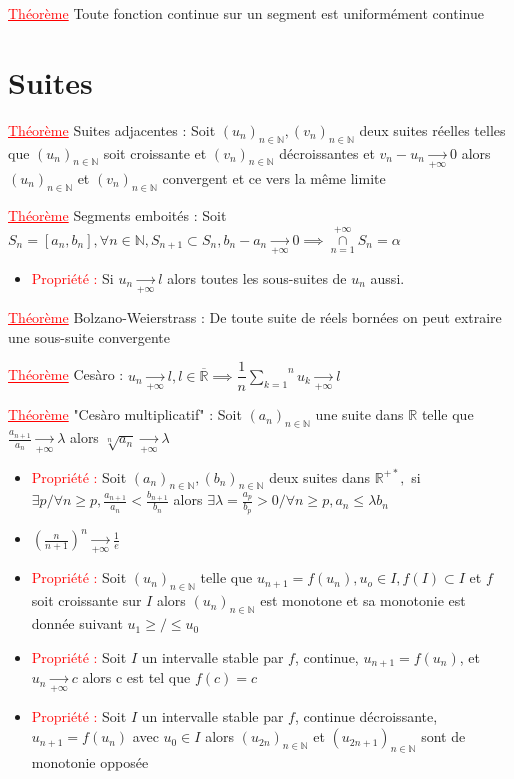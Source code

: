 \documentclass[a4paper, french]{article}
\newcommand{\R}{\mathbb{R}}
\newcommand{\N}{\mathbb{N}}
\newcommand{\al}{\alpha}
\newcommand{\la}{\lambda}
\newcommand{\som}[2]{\overset{#2}{\underset{#1}{\sum}}}
\newcommand{\thm}{\textcolor{red}{\underline{Théorème} }}
\newcommand{\ppt}{\textcolor{red}{Propriété : }}
\newcommand{\limit}[1]{\underset{#1}{\rightarrow}}
\newcommand{\inv}[1]{\frac{1}{#1}}
\begin{document}
	 \thm Toute fonction continue sur un segment est uniformément continue

	\section{Suites}
	 \thm Suites adjacentes : Soit $(u_n)_{n \in \N}, (v_n)_{n \in \N}$ deux suites réelles telles que $(u_n)_{n \in \N}$ soit croissante et $(v_n)_{n \in \N}$ décroissantes et $v_n-u_n\limit{+\infty}0$ alors $(u_n)_{n \in \N}$ et $(v_n)_{n \in \N}$ convergent et ce vers la même limite
	 
	 \thm Segments emboités : Soit $S_n=[a_n,b_n], \forall n \in \N, S_{n+1} \subset S_n, b_n-a_n\limit{+\infty}0 \implies \overset{+\infty}{\underset{n=1}{\cap}} S_n={\al}$
	\begin{itemize}[label=\(\bullet\)]
	  \item \ppt Si $u_n \limit{+\infty}l$ alors toutes les sous-suites de $u_n$ aussi.
	\end{itemize}

	 \thm Bolzano-Weierstrass : De toute suite de réels bornées on peut extraire une sous-suite convergente 
	 
	 \thm Cesàro : $u_n \limit{+\infty}l, l \in \overline{\R} \implies \dfrac{1}{n}\som{k=1}{n}u_k \limit{+\infty}l$ 
	 
	 \thm "Cesàro multiplicatif" : Soit $(a_n)_{n \in \N}$ une suite dans $\R$ telle que $\frac{a_{n+1}}{a_n}\limit{+\infty}\la$ alors $\sqrt[n]{a_n}\limit{+\infty}\la$

	\begin{itemize}[label=\(\bullet\)]
	  \item \ppt Soit $(a_n)_{n \in \N},(b_n)_{n \in \N}$ deux suites dans $\R^{+*},$ si $\exists p / \forall n \geqslant p, \frac{a_{n+1}}{a_n} < \frac{b_{n+1}}{b_n}$ alors $\exists \la = \frac{a_p}{b_p}>0/ \forall n \geqslant p, a_n \leqslant \la b_n$
	  \item $(\frac{n}{n+1})^n\limit{+\infty}\inv{e}$
	  \item \ppt Soit $(u_n)_{n \in \N}$ telle que $u_{n+1}=f(u_n), u_o \in I, f(I) \subset I$ et $f$ soit croissante sur $I$ alors $(u_n)_{n \in \N}$ est monotone et sa monotonie est donnée suivant $u_1 \geqslant/\leqslant u_0$
	  \item \ppt Soit $I$ un intervalle stable par $f$, continue, $u_{n+1}=f(u_n)$, et $u_n\limit{+\infty}c$ alors c est tel que $f(c)=c$
	  \item \ppt Soit $I$ un intervalle stable par $f$, continue décroissante, $u_{n+1}=f(u_n)$ avec $u_0 \in I$ alors $(u_{2n})_{n \in \N}$ et $(u_{2n+1})_{n \in \N}$ sont de monotonie opposée
	\end{itemize}
\end{document}
